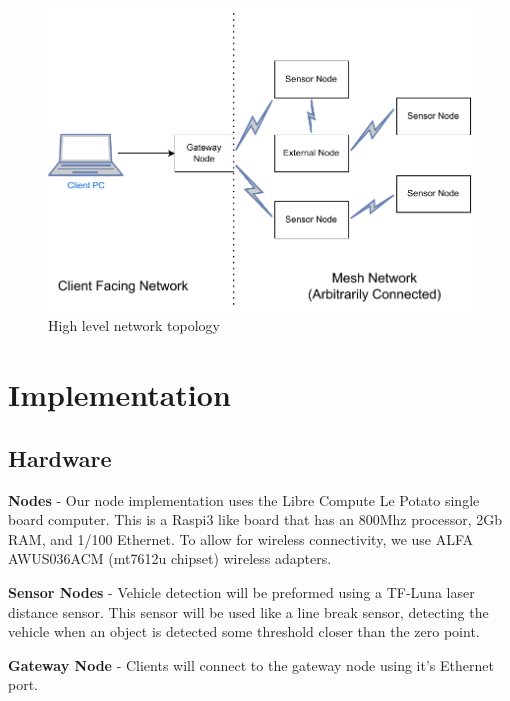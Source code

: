 \documentclass[journal]{IEEEtran}
\begin{document}
\begin{figure}[t]
    \centering
    \includegraphics[width=\linewidth]{images/network_diag.drawio.pdf}
    \caption{High level network topology}
    \label{fig:high_level_net}
\end{figure}

\section{Implementation}

\subsection{Hardware}
\textbf{Nodes} - Our node implementation uses the Libre Compute Le Potato single board computer. This is a Raspi3 like board that has an 800Mhz processor, 2Gb RAM, and 1/100 Ethernet. To allow for wireless connectivity, we use ALFA AWUS036ACM (mt7612u chipset) wireless adapters.

\textbf{Sensor Nodes} - Vehicle detection will be preformed using a TF-Luna laser distance sensor. This sensor will be used like a line break sensor, detecting the vehicle when an object is detected some threshold closer than the zero point.

\textbf{Gateway Node} - Clients will connect to the gateway node using it's Ethernet port.
\end{document}
